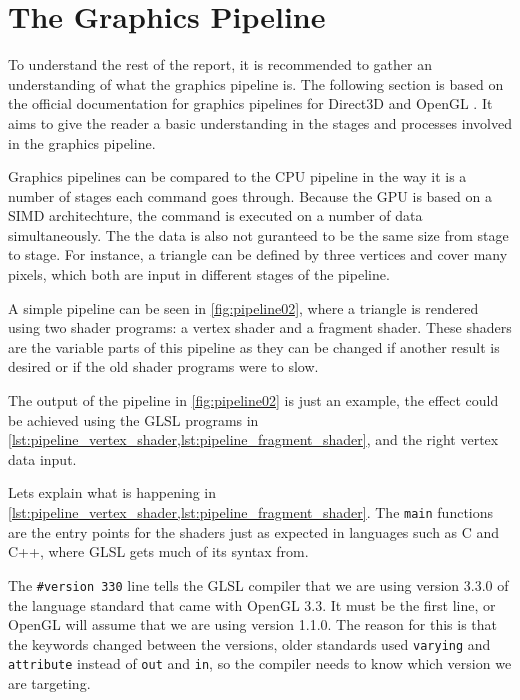 \section{The Graphics Pipeline} \label{sec:pipeline} %
\begin{sectionmeta}
To understand the rest of the report, it is recommended to gather an understanding of what the graphics pipeline is.
The following section is based on the official documentation for graphics pipelines for Direct3D and OpenGL \cite{khronos????pipeline, microsoft????pipeline}.
It aims to give the reader a basic understanding in the stages and processes involved in the graphics pipeline.
\end{sectionmeta}

Graphics pipelines can be compared to the \gls{CPU} pipeline in the way it is a number of stages each command goes through.
Because the \gls{GPU} is based on a \gls{SIMD} architechture, the command is executed on a number of data simultaneously.
The the data is also not guranteed to be the same size from stage to stage.
For instance, a triangle can be defined by three vertices and cover many pixels, which both are input in different stages of the pipeline.

A simple pipeline can be seen in \cref{fig:pipeline02}, where a triangle is rendered using two shader programs: a vertex shader and a fragment shader.
These shaders are the variable parts of this pipeline as they can be changed if another result is desired or if the old shader programs were to slow.


The output of the pipeline in \cref{fig:pipeline02} is just an example, the effect could be achieved using the \gls{GLSL} programs in \cref{lst:pipeline_vertex_shader,lst:pipeline_fragment_shader}, and the right vertex data input.

Lets explain what is happening in \cref{lst:pipeline_vertex_shader,lst:pipeline_fragment_shader}.
The \texttt{main} functions are the entry points for the shaders just as expected in languages such as C and C++, where \gls{GLSL} gets much of its syntax from.

The \texttt{\#version 330} line tells the \gls{GLSL} compiler that we are using version 3.3.0 of the language standard that came with OpenGL 3.3.
It must be the first line, or OpenGL will assume that we are using version 1.1.0.
The reason for this is that the keywords changed between the versions, older standards used \texttt{varying} and \texttt{attribute} instead of \texttt{out} and \texttt{in}, so the compiler needs to know which version we are targeting.

